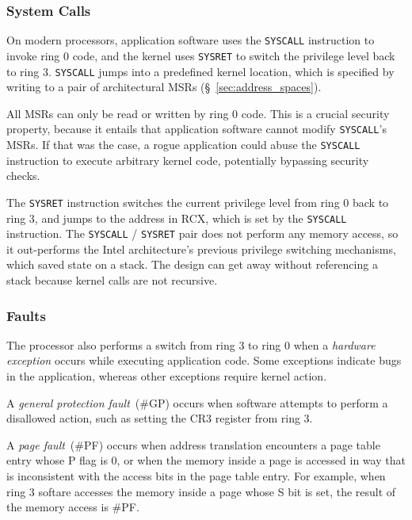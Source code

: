 \subsubsection{System Calls}
\label{sec:syscalls}


On modern processors, application software uses the \texttt{SYSCALL}
instruction to invoke ring 0 code, and the kernel uses \texttt{SYSRET} to
switch the privilege level back to ring 3. \texttt{SYSCALL} jumps into a
predefined kernel location, which is specified by writing to a pair of
architectural MSRs (\S~\ref{sec:address_spaces}).

All MSRs can only be read or written by ring 0 code. This is a crucial security
property, because it entails that application software cannot modify
\texttt{SYSCALL}'s MSRs. If that was the case, a rogue application could abuse
the \texttt{SYSCALL} instruction to execute arbitrary kernel code, potentially
bypassing security checks.

The \texttt{SYSRET} instruction switches the current privilege level from ring
0 back to ring 3, and jumps to the address in RCX, which is set by the
\texttt{SYSCALL} instruction. The \texttt{SYSCALL} / \texttt{SYSRET} pair does
not perform any memory access, so it out-performs the Intel architecture's
previous privilege switching mechanisms, which saved state on a stack. The
design can get away without referencing a stack because kernel calls are not
recursive.


\subsubsection{Faults}
\label{sec:faults}


The processor also performs a switch from ring 3 to ring 0 when a
\textit{hardware exception} occurs while executing application code. Some
exceptions indicate bugs in the application, whereas other exceptions require
kernel action.

A \textit{general protection fault}~(\#GP) occurs when software attempts to
perform a disallowed action, such as setting the CR3 register from ring 3.

A \textit{page fault}~(\#PF) occurs when address translation encounters a page
table entry whose P flag is 0, or when the memory inside a page is accessed in
way that is inconsistent with the access bits in the page table entry. For
example, when ring 3 softare accesses the memory inside a page whose S bit is
set, the result of the memory access is \#PF.


